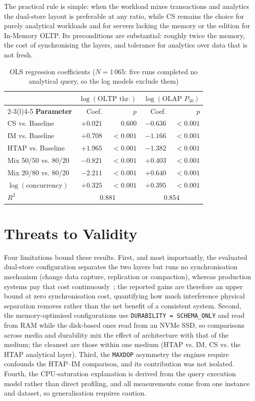 \documentclass[10pt,conference,a4paper]{IEEEtran}
\begin{document}
The practical rule is simple: when the workload mixes transactions and
analytics the dual-store layout is preferable at any ratio, while CS remains
the choice for purely analytical workloads and for servers lacking the memory
or the edition for In-Memory OLTP. Its preconditions are substantial: roughly
twice the memory, the cost of synchronising the layers, and tolerance for
analytics over data that is not fresh.

\begin{table}[t]
\caption{OLS regression coefficients ($N = 1\,065$: five runs completed no
analytical query, so the log models exclude them)}
\label{tab:ols}
\centering
\footnotesize
\begin{tabular}{@{}lrrrr@{}}
\toprule
& \multicolumn{2}{c}{$\log(\text{OLTP thr.})$} & \multicolumn{2}{c}{$\log(\text{OLAP } P_{50})$}\\
\cmidrule(lr){2-3}\cmidrule(l){4-5}
\textbf{Parameter} & Coef. & $p$ & Coef. & $p$\\
\midrule
CS vs. Baseline        & $+0.021$ & 0.600  & $-0.636$ & $<0.001$\\
IM vs. Baseline        & $+0.708$ & $<0.001$ & $-1.166$ & $<0.001$\\
HTAP vs. Baseline      & $+1.965$ & $<0.001$ & $-1.382$ & $<0.001$\\
Mix 50/50 vs. 80/20    & $-0.821$ & $<0.001$ & $+0.403$ & $<0.001$\\
Mix 20/80 vs. 80/20    & $-2.211$ & $<0.001$ & $+0.640$ & $<0.001$\\
$\log(\text{concurrency})$ & $+0.325$ & $<0.001$ & $+0.395$ & $<0.001$\\
\midrule
$R^2$ & \multicolumn{2}{c}{0.881} & \multicolumn{2}{c}{0.854}\\
\bottomrule
\end{tabular}
\end{table}

\section{Threats to Validity}
\label{sec:threats}
Four limitations bound these results. First, and most importantly, the
evaluated dual-store configuration separates the two layers but runs no
synchronisation mechanism (change data capture, replication or compaction),
whereas production systems pay that cost
continuously~\cite{huang2020, yang2020}; the reported gains are therefore an upper
bound at zero synchronisation cost, quantifying how much interference
physical separation removes rather than the net benefit of a consistent
system. Second, the memory-optimised configurations use
\texttt{DURABILITY = SCHEMA\_ONLY} and read from RAM while the disk-based ones
read from an NVMe SSD, so comparisons across media and durability mix
the effect of architecture with that of the medium; the cleanest are those
within one medium (HTAP vs. IM, CS vs. the HTAP analytical layer). Third, the \texttt{MAXDOP} asymmetry the engines require confounds the
HTAP--IM comparison, and its contribution was not isolated.
Fourth, the CPU-saturation explanation is derived from the query execution
model rather than direct profiling, and all measurements come from one
instance and dataset, so generalisation requires caution.
\end{document}
